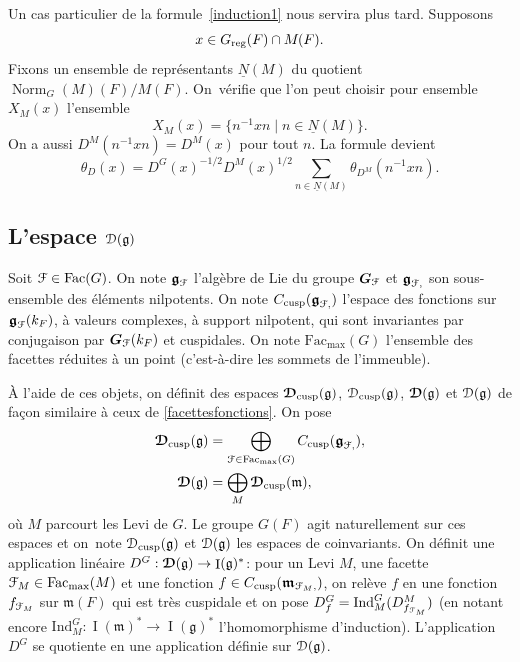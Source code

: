 \documentclass[11pt]{article}
\numberwithin{equation}{section}\providecommand{\og}{«\,}\providecommand{\fg}{\,»}
\let\mathcal \EuScript
\newcommand{\NoChangel}[1]{%
\expandafter\let\csname old\string#1\endcsname=#1
\let#1=\relax
\newcommand{#1}{\mathcode`l="716C\csname old\string#1\endcsname\mathcode`l="7160 }%
}
\let\sep\mid
\newcommand{\frg}{\mathfrak{g}}
\newcommand{\mfrm}{\mathfrak{m}}
\newcommand{\cusp}{\mathrm{cusp}}
\newcommand{\rell}{\mathrm{ell}} \NoChangel{\rell}
\newcommand{\Fac}{\mathrm{Fac}}
\newcommand{\Ind}{\mathrm{Ind}}
\newcommand{\nil}{\mathrm{nil}} \NoChangel{\nil}
\newcommand{\reg}{\mathrm{reg}}
\DeclareMathOperator{\rI}{I}
\DeclareMathOperator{\Norm}{Norm}
\newcommand{\bG}{\boldsymbol{G}}
\newcommand{\cD}{\mathcal{D}}
\newcommand{\cF}{\mathcal{F}}
\theoremstyle{plain}
\theoremstyle{definition}
\begin{document}
Un cas particulier de la formule~\eqref{induction1} nous servira plus tard. Supposons
\[
x\in G_{\reg}(F)\cap M_{\rell}(F).
\]
Fixons un ensemble de représentants $\underline{N}(M)$ du quotient $\Norm_{G}(M)(F)/ M(F)$. On~véri\-fie que l'on peut choisir pour ensemble $X_{M}(x)$ l'ensemble
\[
X_{M}(x)=\{n^{-1}xn\sep n\in \underline{N}(M)\}.
\]
On a aussi $D^M(n^{-1}xn)=D^M(x)$ pour tout $n$. La formule devient
\begin{equation}\tag{3}\label{induction3}
\theta_{D}(x)=D^G(x)^{-1/2}D^M(x)^{1/2}\sum_{n\in \underline{N}(M)}\theta_{D^M}(n^{-1}xn).
\end{equation}

\subsection{L'espace \texorpdfstring{$\cD(\frg)$}{Dg}}\label{lespace}

Soit $\cF\in \Fac(G)$. On note $\boldsymbol{\frg}_{\cF}$ l'algèbre de Lie du groupe $\bG_{\cF}$ et $\boldsymbol{\frg}_{\cF,\nil}$ son sous-ensemble des éléments nilpotents. On note $C_{\cusp}(\boldsymbol{\frg}_{\cF,\nil})$ l'espace des fonctions sur $\boldsymbol{\frg}_{\cF}(k_{F})$, à valeurs complexes, à support nilpotent, qui sont invariantes par conjugaison par $\bG_{\cF}(k_{F})$ et cuspidales. On note $\Fac_{\max}(G)$ l'ensemble des facettes réduites à un point (c'est-à-dire les sommets de l'immeuble).

À l'aide de ces objets, on définit des espaces $\boldsymbol{\cD}_{\cusp}(\frg)$, $\cD_{\cusp}(\frg)$, $\boldsymbol{\cD}(\frg)$ et $\cD(\frg)$ de façon similaire à ceux de \ref{facettesfonctions}. On pose\vspace*{-3pt}
\begin{align*}
\boldsymbol{\cD}_{\cusp}(\frg)&=\bigoplus_{\cF\in \Fac_{\max}(G)}C_{\cusp}(\boldsymbol{\frg}_{\cF,\nil}),
\\
\boldsymbol{\cD}(\frg)&=\bigoplus_{M}\boldsymbol{\cD}_{\cusp}(\mfrm),
\end{align*}
où $M$ parcourt les Levi de $G$. Le groupe $G(F)$ agit naturellement sur ces espaces et on~note $\cD_{\cusp}(\frg)$ et $\cD(\frg)$ les espaces de coinvariants. On définit une application linéaire $D^G:\boldsymbol{\cD}(\frg)\to \rI(\frg)^*$: pour un Levi $M$, une facette $\cF_{M}\in \Fac_{\max}(M)$ et une fonction $f\in C_{\cusp}(\boldsymbol{\mfrm}_{\cF_{M},\nil})$, on relève $f$ en une fonction $f_{\cF_{M}}$ sur $\mfrm(F)$ qui est très cuspidale et on pose $D^G_{f}=\Ind_{M}^G(D^M_{f_{\cF_{M}}})$ (en notant encore $\Ind_{M}^G:\rI(\mfrm)^*\to \rI(\frg)^*$ l'homomorphisme d'induction). L'application $D^G$ se quotiente en une application définie sur $\cD(\frg)$.
\end{document}

